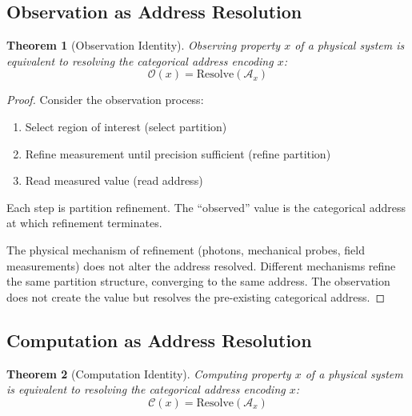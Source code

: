 \documentclass[10pt,twocolumn]{article}
\theoremstyle{plain}
\newtheorem{theorem}{Theorem}[section]
\theoremstyle{definition}
\theoremstyle{remark}
\newcommand{\Obs}{\mathcal{O}}
\newcommand{\Comp}{\mathcal{C}}
\begin{document}
\subsection{Observation as Address Resolution}

\begin{theorem}[Observation Identity]
\label{thm:obs_identity}
Observing property $x$ of a physical system is equivalent to resolving the categorical address encoding $x$:
\begin{equation}
\Obs(x) = \mathrm{Resolve}(\mathcal{A}_x)
\label{eq:obs_resolve}
\end{equation}
\end{theorem}

\begin{proof}
Consider the observation process:
\begin{enumerate}[label=(\roman*)]
\item Select region of interest (select partition)
\item Refine measurement until precision sufficient (refine partition)
\item Read measured value (read address)
\end{enumerate}
Each step is partition refinement. The ``observed'' value is the categorical address at which refinement terminates.

The physical mechanism of refinement (photons, mechanical probes, field measurements) does not alter the address resolved. Different mechanisms refine the same partition structure, converging to the same address. The observation does not create the value but resolves the pre-existing categorical address.
\end{proof}

\subsection{Computation as Address Resolution}

\begin{theorem}[Computation Identity]
\label{thm:comp_identity}
Computing property $x$ of a physical system is equivalent to resolving the categorical address encoding $x$:
\begin{equation}
\Comp(x) = \mathrm{Resolve}(\mathcal{A}_x)
\label{eq:comp_resolve}
\end{equation}
\end{theorem}
\end{document}
